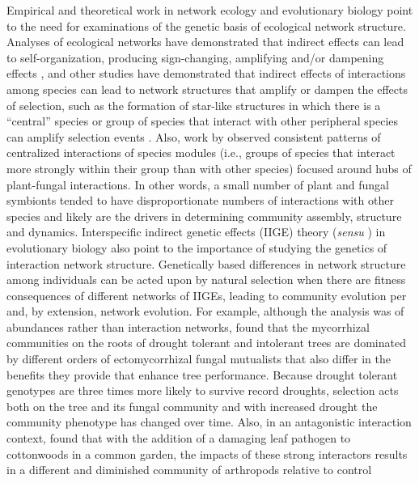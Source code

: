\documentclass[fleqn,12pt]{olplainarticle}
\begin{document}
Empirical and theoretical work in network ecology and evolutionary
biology point to the need for examinations of the genetic basis of
ecological network structure. Analyses of ecological networks have
demonstrated that indirect effects can lead to self-organization,
producing sign-changing, amplifying and/or dampening effects
\citep{Fath1998, Newman2006, Sole2006Self-OrganizationEcosystems}, and
other studies have demonstrated that indirect effects of interactions
among species can lead to network structures that amplify or dampen
the effects of selection, such as the formation of star-like
structures in which there is a ``central'' species or group of species
that interact with other peripheral species can amplify selection
events \citep{Lieberman2005EvolutionaryGraphs}. Also, work by
\cite{Toju2014a, Toju2016, Toju2017} observed consistent patterns of
centralized interactions of species modules (i.e., groups of species
that interact more strongly within their group than with other
species) focused around hubs of plant-fungal interactions. In other
words, a small number of plant and fungal symbionts tended to have
disproportionate numbers of interactions with other species and likely
are the drivers in determining community assembly, structure and
dynamics.  Interspecific indirect genetic effects (IIGE) theory
(\textit{sensu} \cite{Shuster2006COMMUNITYSTRUCTURE}) in evolutionary
biology also point to the importance of studying the genetics of
interaction network structure. Genetically based differences in
network structure among individuals can be acted upon by natural
selection when there are fitness consequences of different networks of
IIGEs, leading to community evolution per
\cite{Whitham2020IntraspecificEvolution} and, by extension, network
evolution. For example, although the analysis was of abundances rather
than interaction networks, \cite{Gehring2014PlantChange, Gehring2017a}
found that the mycorrhizal communities on the roots of drought
tolerant and intolerant trees are dominated by different orders of
ectomycorrhizal fungal mutualists that also differ in the benefits
they provide that enhance tree performance. Because drought tolerant
genotypes are three times more likely to survive record droughts,
selection acts both on the tree and its fungal community and with
increased drought the community phenotype has changed over time. Also,
in an antagonistic interaction context, \cite{Busby2015} found that
with the addition of a damaging leaf pathogen to cottonwoods in a
common garden, the impacts of these strong interactors results in a
different and diminished community of arthropods relative to control
\end{document}
